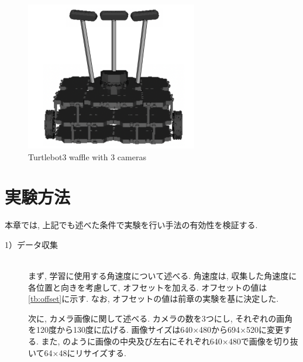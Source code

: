 \begin{figure}[h]
  \centering
  \includegraphics[keepaspectratio, scale=0.55]{images/turtlebot3.png}
  \caption{Turtlebot3 waffle with 3 cameras}
  \label{Fig:turtlebot3_3cam}
\end{figure}

\section{実験方法}
本章では, 上記でも述べた条件で実験を行い手法の有効性を検証する. 

\begin{description}
  \item[1）データ収集]\mbox{}\\ \hspace*{3mm}まず, 学習に使用する角速度について述べる. 角速度は, 収集した角速度に各位置と向きを考慮して, オフセットを加える. オフセットの値は\ref{tb:offset}に示す. なお, オフセットの値は前章の実験を基に決定した. \par \hspace*{3mm}次に, カメラ画像に関して述べる. カメラの数を3つにし, それぞれの画角を120度から130度に広げる. 画像サイズは640×480から694×520に変更する. また, のように画像の中央及び左右にそれぞれ640×480で画像を切り抜いて64×48にリサイズする. 
\end{description}

